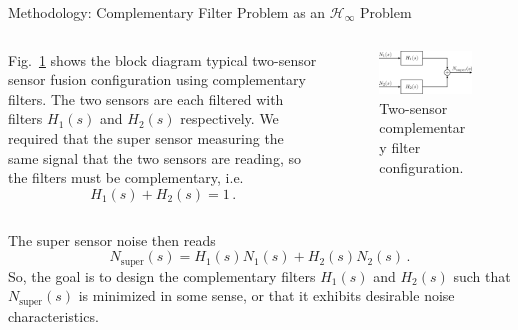 \documentclass{beamer}
\begin{document}
\begin{frame}[t]
\begin{columns}[t]
\begin{column}{0.32\linewidth}
			\begin{block}{Methodology: Complementary Filter Problem as an $\mathcal{H}_\infty$ Problem}
				\begin{columns}[t, onlytextwidth]
					\begin{column}{0.5\textwidth}
						Fig.~\ref{fig:two-sensor} shows the block diagram typical two-sensor sensor fusion configuration using complementary filters.
						The two sensors are each filtered with filters $H_1(s)$ and $H_2(s)$ respectively.
						We required that the super sensor measuring the same signal that the two sensors are reading, so the filters must be complementary, i.e.
						\begin{equation}
							H_1(s) + H_2(s) = 1\,.
							\label{eqn:complementary}
						\end{equation}
					\end{column}
					\begin{column}{0.45\textwidth}
						\begin{figure}
							\centering
							\includegraphics[width=1\linewidth]{complementary_filter}
							\caption{Two-sensor complementary filter configuration.}
							\label{fig:two-sensor}
						\end{figure}
					\end{column}
				\end{columns}
			
			\medskip
			
			The super sensor noise then reads
			\begin{equation}
				N_\text{super}(s) = H_1(s)N_1(s) + H_2(s)N_2(s)\,.
				\label{eqn:noise_super}
			\end{equation}
			So, the goal is to design the complementary filters $H_1(s)$ and $H_2(s)$ such that $N_\text{super}(s)$ is minimized in some sense, or that it exhibits desirable noise characteristics.
			

\end{block}
\end{column}
\end{columns}
\end{frame}
\end{document}
